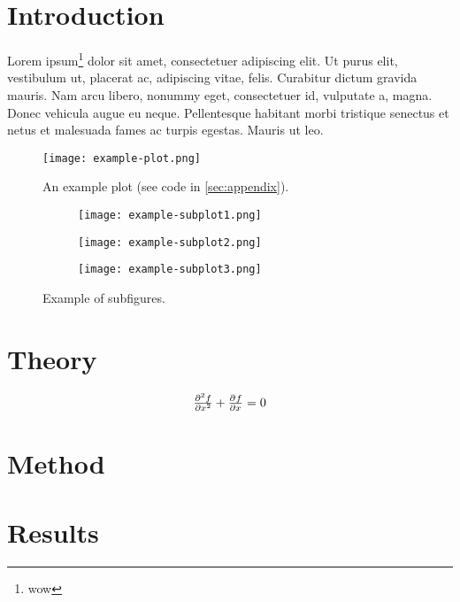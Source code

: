 \documentclass[11pt]{article}
\begin{document}
\tableofcontents

\clearpage
\section{Introduction}
\label{sec:introduction}
Lorem ipsum\footnote{wow} dolor sit amet, consectetuer adipiscing elit. Ut purus elit,
vestibulum ut, placerat ac, adipiscing vitae, felis. Curabitur dictum gravida
mauris. Nam arcu libero, nonummy eget, consectetuer id, vulputate a, magna.
Donec vehicula augue eu neque. Pellentesque habitant morbi tristique senectus
et netus et malesuada fames ac turpis egestas. Mauris ut leo\cite{example}.

\begin{figure}[hpb]
  \centering
  \texttt{[image: example-plot.png]}
  \caption{An example plot (see code in \cref{sec:appendix}).}
  \label{fig:plot}
\end{figure}

\begin{figure}[hpb]
  \centering
  \begin{subfigure}[b]{0.3\textwidth}
    \texttt{[image: example-subplot1.png]}
  \end{subfigure}
  \begin{subfigure}[b]{0.3\textwidth}
    \texttt{[image: example-subplot2.png]}
  \end{subfigure}
  \begin{subfigure}[b]{0.3\textwidth}
    \texttt{[image: example-subplot3.png]}
  \end{subfigure}
  \caption{Example of subfigures.}
\end{figure}

\clearpage
\section{Theory}
\label{sec:theory}

\begin{equation}
  \pd[2]{f}{x} + \pd{f}{x} = 0
\end{equation}

\clearpage
\section{Method}
\label{sec:method}

\clearpage
\section{Results}
\label{sec:results}
\end{document}
